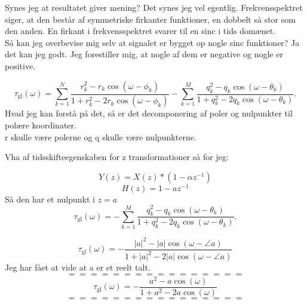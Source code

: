 \begin{Opgaver}
\begin{kapitel}
\begin{Opgave}
\begin{UnderOpgave}[Graph the impulse response for $n_d = 0$ for $-100\leq n \leq 100$]
            \end{UnderOpgave}
            \begin{UnderOpgave}
            \end{UnderOpgave}
            Synes jeg at resultatet giver mening? 
            Det synes jeg vel egentlig. 
            Frekvensspektret siger, at den består af symmetriske firkanter funktioner, en dobbelt så stor som den anden.
            En firkant i frekvensspektret svarer til en sinc i tids domænet. \\
            Så kan jeg overbevise mig selv at signalet er bygget op nogle sinc funktioner? 
            Ja det kan jeg godt. Jeg forestiller mig, at nogle af dem er negative og nogle er positive. 
        \end{Opgave}
        \begin{Opgave}
            \[\tau_{\mathrm{gl}}(\omega)=\sum_{k=1}^{N}{\frac{r_{k}^{2}-r_{k}\cos(\omega-\phi_{k})}{1+r_{k}^{2}-2r_{k}\cos(\omega-\phi_{k})}}-\sum_{k=1}^{M}{\frac{q_{k}^{2}-q_{k}\cos(\omega-\theta_{k})}{1+q_{k}^{2}-2q_{k}\cos(\omega-\theta_{k})}}.\]
            Hvad jeg kan forstå på det, så er det decomponering af poler og nulpunkter til polære koordinater. \\
            r skulle være polerne og q skulle være nulpunkterne. 
            \begin{UnderOpgave}[\text{$y[n] = x[n]-\alpha x[n-1]$}]
                Vha af tidsskifteegenskaben for z transformationer så for jeg: 

                \[Y(z) = X(z) * (1 - \alpha z^{-1})\]
                \[H(z) = 1 - az^{-1}\]
                Så den har et nulpunkt i $z = a$
                \[\tau_{\mathrm{gl}}(\omega)= -\sum_{k=1}^{M}{\frac{q_{k}^{2}-q_{k}\cos(\omega-\theta_{k})}{1+q_{k}^{2}-2q_{k}\cos(\omega-\theta_{k})}}.\]

                \[\tau_{\mathrm{gl}}(\omega) = - {\frac{|a|^{2}-|a|\cos(\omega-\angle a)}{1+|a|^{2}-2 |a|\cos(\omega-\angle a)}}\]
                Jeg har fået at vide at a er et reelt talt.
                \[================\]
                \[\tau_{\mathrm{gl}}(\omega) = - {\frac{a^{2}-a\cos(\omega)}{1+a^{2}-2 a\cos(\omega)}}\]
                \[================\]
                
            \end{UnderOpgave}


\end{Opgave}
\end{kapitel}
\end{Opgaver}
